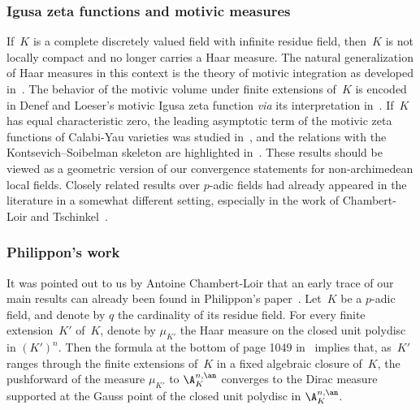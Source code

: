 \subsubsection*{Igusa zeta functions and motivic measures}
If~$K$ is a complete discretely valued field with infinite residue field, then~$K$ is not locally compact and no longer carries a Haar measure. The natural generalization of Haar measures in this context is the theory of motivic integration as developed in~\cite{loeser-sebag}. The behavior of the motivic volume under finite extensions of~$K$ is encoded in Denef and Loeser's motivic Igusa zeta function {\em via} its interpretation in~\cite{nicaise-sebag}. If~$K$ has equal characteristic zero, the leading asymptotic term of the motivic zeta functions of Calabi-Yau varieties was studied in~\cite{halle-nicaise}, and the relations with the Kontsevich--Soibelman skeleton are highlighted in~\cite[3.2.3]{halle-nicaise}. These results should be viewed as a geometric version of our convergence statements for non-archimedean local fields.
Closely related results over $p$-adic fields had already appeared in the literature in a somewhat different setting, especially in the work of Chambert-Loir and Tschinkel~\cite{CLT}.

\subsubsection*{Philippon's work}
It was pointed out to us by Antoine Chambert-Loir that an early trace of our main results can already been found in Philippon's paper~\cite{philippon}. Let~$K$ be a $p$-adic field, and denote by $q$ the cardinality of its residue field.
For every finite extension~$K'$ of~$K$, denote by $\mu_{K'}$ the Haar measure on the closed unit polydisc in $(K')^n$.
Then the formula at the bottom of page 1049 in~\cite{philippon} implies that, as~$K'$ ranges through the finite extensions of~$K$ in a fixed algebraic closure of~$K$, the pushforward of the measure $\mu_{K'}$ to $\A^{n,\an}_K$ converges to the Dirac measure
supported at the Gauss point of the closed unit polydisc in $\A^{n,\an}_K$.

